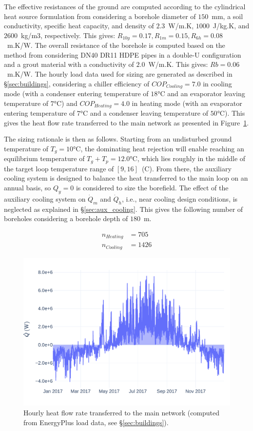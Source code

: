 The effective resistances of the ground are computed according to the cylindrical heat source formulation from \cite{Carslaw1947} considering a borehole diameter of $150$~mm, a soil conductivity, specific heat capacity, and density of $2.3$~W/m.K, $1000$~J/kg.K, and $2600$~kg/m3, respectively.
This gives: $R_{10y} = 0.17, R_{1m} = 0.15, R_{6h} = 0.08$~m.K/W.
The overall resistance of the borehole is computed based on the method from \cite{Kavanaugh2014} considering DN40 DR11 HDPE pipes in a double-U configuration and a grout material with a conductivity of $2.0$~W/m.K. This gives: $Rb = 0.06$~m.K/W.
The hourly load data used for sizing are generated as described in §\ref{sec:buildings}, considering a chiller efficiency of $COP_{Cooling} = 7.0$ in cooling mode (with a condenser entering temperature of $18$°C and an evaporator leaving temperature of $7$°C) and $COP_{Heating} = 4.0$ in heating mode (with an evaporator entering temperature of $7$°C and a condenser leaving temperature of $50$°C). This gives the heat flow rate transferred to the main network as presented in Figure~\ref{fig:q_to_ground}.

The sizing rationale is then as follows. Starting from an undisturbed ground temperature of $T_g = 10$°C, the dominating heat rejection will enable reaching an equilibrium temperature of $T_g + T_p = 12.0$°C, which lies roughly in the middle of the target loop temperature range of $[9, 16]$~(C).
From there, the auxiliary cooling system is designed to balance the heat transferred to the main loop on an annual basis, so $Q_y = 0$ is considered to size the borefield. The effect of the auxiliary cooling system on $\dot{Q}_m$ and $\dot{Q}_h$, i.e., near cooling design conditions, is neglected as explained in §\ref{sec:aux_cooling}.
This gives the following number of boreholes considering a borehole depth of $180$~m.

\begin{align}
    \label{eq:geo_sizing_results}
    n_{Heating} &= 705  \\
    n_{Cooling} &= 1426 \nonumber
\end{align}


\begin{figure}[!htbp]
    \centering
    \includegraphics[width=.7\linewidth]{../python_scripts/figures/QToGround.pdf}
    \caption{Hourly heat flow rate transferred to the main network (computed from EnergyPlus load data, see §\ref{sec:buildings}).}
    \label{fig:q_to_ground}
\end{figure}


